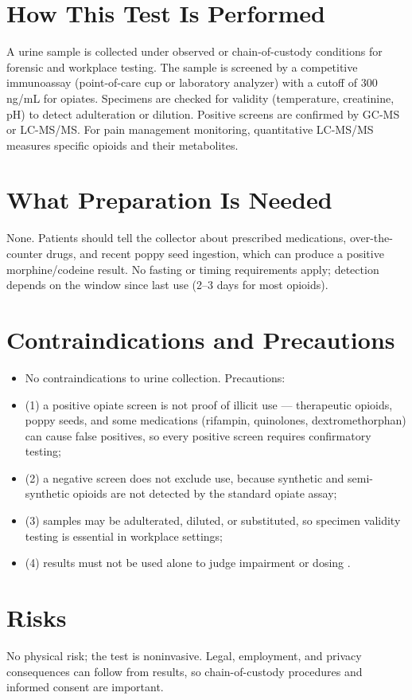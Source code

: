 \section*{How This Test Is Performed}
A urine sample is collected under observed or chain-of-custody conditions for forensic and workplace testing. The sample is screened by a competitive immunoassay (point-of-care cup or laboratory analyzer) with a cutoff of 300 ng/mL for opiates. Specimens are checked for validity (temperature, creatinine, pH) to detect adulteration or dilution. Positive screens are confirmed by GC-MS or LC-MS/MS. For pain management monitoring, quantitative LC-MS/MS measures specific opioids and their metabolites.
\section*{What Preparation Is Needed}
None. Patients should tell the collector about prescribed medications, over-the-counter drugs, and recent poppy seed ingestion, which can produce a positive morphine/codeine result. No fasting or timing requirements apply; detection depends on the window since last use (2--3 days for most opioids).
\section*{Contraindications and Precautions}
\begin{itemize}
  \item No contraindications to urine collection. Precautions:
  \item (1) a positive opiate screen is not proof of illicit use --- therapeutic opioids, poppy seeds, and some medications (rifampin, quinolones, dextromethorphan) can cause false positives, so every positive screen requires confirmatory testing;
  \item (2) a negative screen does not exclude use, because synthetic and semi-synthetic opioids are not detected by the standard opiate assay;
  \item (3) samples may be adulterated, diluted, or substituted, so specimen validity testing is essential in workplace settings;
  \item (4) results must not be used alone to judge impairment or dosing \cite{wolff1999review}.
\end{itemize}
\section*{Risks}
No physical risk; the test is noninvasive. Legal, employment, and privacy consequences can follow from results, so chain-of-custody procedures and informed consent are important.
